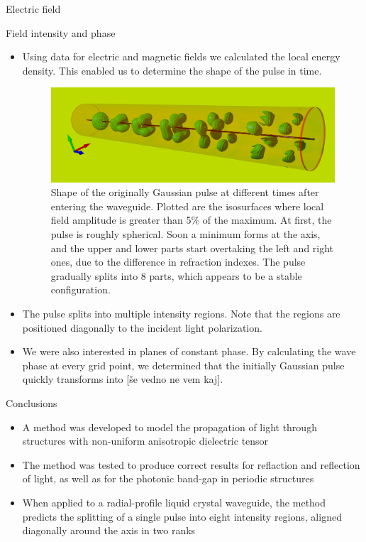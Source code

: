 \documentclass{beamer}
\newlength{\wideitemsep}
\let\olditem\item
\renewcommand{\item}{\setlength{\itemsep}{\wideitemsep}\olditem}
\newcommand{\blockpadding}{
  \rule[-0.6ex]{0pt}{2.5ex}
}
\begin{document}
\begin{columns}[t]
\begin{column}{0.596\textwidth}
\begin{block}{\blockpadding Electric field}
\end{block}
\begin{block}{\blockpadding Field intensity and phase}
\begin{itemize}
 \item Using data for electric and magnetic fields we calculated the local energy density. This enabled us to determine the shape of the pulse in time. 
 \begin{figure}[h]
  \centering
  \includegraphics[width=.825\textwidth]{./Povray/intensity_gauss}
  \caption{Shape of the originally Gaussian pulse at different times after entering the waveguide. Plotted are the isosurfaces where local field amplitude is greater than 5\% of the maximum. At first, the pulse is roughly spherical. Soon a minimum forms at the axis, and the upper and lower parts start overtaking the left and right ones, due to the difference in refraction indexes. The pulse gradually splits into 8 parts, which appears to be a stable configuration. }
 \end{figure}
 \item The pulse splits into multiple intensity regions. Note that the regions are positioned diagonally to the incident light polarization. 

 \item We were also interested in planes of constant phase. By calculating the wave phase at every grid point, we determined that the initially Gaussian pulse quickly transforms into [\v se vedno ne vem kaj]. 
\end{itemize}


\end{block}

\begin{block}{\blockpadding Conclusions}
 \begin{itemize}
  \item A method was developed to model the propagation of light through structures with non-uniform anisotropic dielectric tensor
  \item The method was tested to produce correct results for reflaction and reflection of light, as well as for the photonic band-gap in periodic structures
  \item When applied to a radial-profile liquid crystal waveguide, the method predicts the splitting of a single pulse into eight intensity regions, aligned diagonally around the axis in two ranks
 \end{itemize}

\end{block}

 \end{column}

\end{columns}
\end{document}
